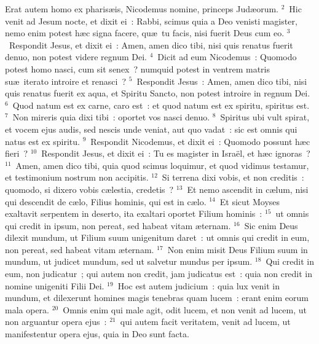 \lettrine[lines=10,image=true,loversize=0.05,lraise=-0.03]{E}{}rat autem homo ex pharis\ae is, Nicodemus nomine, princeps Jud\ae orum.
${}^{2}$~Hic venit ad Jesum nocte, et dixit ei~: Rabbi, scimus quia a Deo venisti magister, nemo enim potest h\ae c signa facere, qu\ae\ tu facis, nisi fuerit Deus cum eo.
${}^{3}$~Respondit Jesus, et dixit ei~: Amen, amen dico tibi, nisi quis renatus fuerit denuo, non potest videre regnum Dei.
${}^{4}$~Dicit ad eum Nicodemus~: Quomodo potest homo nasci, cum sit senex~? numquid potest in ventrem matris su\ae\ iterato introire et renasci~?
${}^{5}$~Respondit Jesus~: Amen, amen dico tibi, nisi quis renatus fuerit ex aqua, et Spiritu Sancto, non potest introire in regnum Dei.
${}^{6}$~Quod natum est ex carne, caro est~: et quod natum est ex spiritu, spiritus est.
${}^{7}$~Non mireris quia dixi tibi~: oportet vos nasci denuo.
${}^{8}$~Spiritus ubi vult spirat, et vocem ejus audis, sed nescis unde veniat, aut quo vadat~: sic est omnis qui natus est ex spiritu.
${}^{9}$~Respondit Nicodemus, et dixit ei~: Quomodo possunt h\ae c fieri~?
${}^{10}$~Respondit Jesus, et dixit ei~: Tu es magister in Isra\"el, et h\ae c ignoras~?
${}^{11}$~Amen, amen dico tibi, quia quod scimus loquimur, et quod vidimus testamur, et testimonium nostrum non accipitis.
${}^{12}$~Si terrena dixi vobis, et non creditis~: quomodo, si dixero vobis c\ae lestia, credetis~?
${}^{13}$~Et nemo ascendit in c\ae lum, nisi qui descendit de c\ae lo, Filius hominis, qui est in c\ae lo.
${}^{14}$~Et sicut Moyses exaltavit serpentem in deserto, ita exaltari oportet Filium hominis~:
${}^{15}$~ut omnis qui credit in ipsum, non pereat, sed habeat vitam \ae ternam.
${}^{16}$~Sic enim Deus dilexit mundum, ut Filium suum unigenitum daret~: ut omnis qui credit in eum, non pereat, sed habeat vitam \ae ternam.
${}^{17}$~Non enim misit Deus Filium suum in mundum, ut judicet mundum, sed ut salvetur mundus per ipsum.
${}^{18}$~Qui credit in eum, non judicatur~; qui autem non credit, jam judicatus est~: quia non credit in nomine unigeniti Filii Dei.
${}^{19}$~Hoc est autem judicium~: quia lux venit in mundum, et dilexerunt homines magis tenebras quam lucem~: erant enim eorum mala opera.
${}^{20}$~Omnis enim qui male agit, odit lucem, et non venit ad lucem, ut non arguantur opera ejus~:
${}^{21}$~qui autem facit veritatem, venit ad lucem, ut manifestentur opera ejus, quia in Deo sunt facta.


